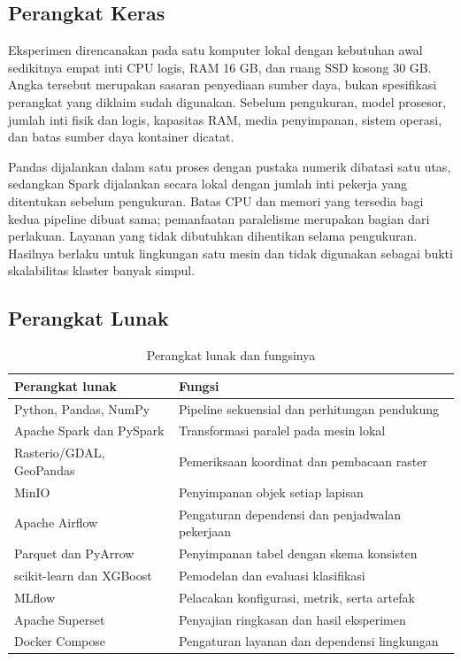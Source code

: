 \subsection{Perangkat Keras}

Eksperimen direncanakan pada satu komputer lokal dengan kebutuhan awal sedikitnya empat inti CPU logis, RAM 16 GB, dan ruang SSD kosong 30 GB. Angka tersebut merupakan sasaran penyediaan sumber daya, bukan spesifikasi perangkat yang diklaim sudah digunakan. Sebelum pengukuran, model prosesor, jumlah inti fisik dan logis, kapasitas RAM, media penyimpanan, sistem operasi, dan batas sumber daya kontainer dicatat.

Pandas dijalankan dalam satu proses dengan pustaka numerik dibatasi satu utas, sedangkan Spark dijalankan secara lokal dengan jumlah inti pekerja yang ditentukan sebelum pengukuran. Batas CPU dan memori yang tersedia bagi kedua pipeline dibuat sama; pemanfaatan paralelisme merupakan bagian dari perlakuan. Layanan yang tidak dibutuhkan dihentikan selama pengukuran. Hasilnya berlaku untuk lingkungan satu mesin dan tidak digunakan sebagai bukti skalabilitas klaster banyak simpul.

\subsection{Perangkat Lunak}

\begin{table}[H]
    \centering
    \caption{Perangkat lunak dan fungsinya}
    \label{tab:bab3-perangkat}
    \small
    \renewcommand{\arraystretch}{1.16}
    \begin{tabularx}{\linewidth}{@{}>{\raggedright\arraybackslash}p{3.8cm}>{\raggedright\arraybackslash}X@{}}
        \toprule
        Perangkat lunak & Fungsi \\
        \midrule
        Python, Pandas, NumPy & Pipeline sekuensial dan perhitungan pendukung \\
        Apache Spark dan PySpark & Transformasi paralel pada mesin lokal \\
        Rasterio/GDAL, GeoPandas & Pemeriksaan koordinat dan pembacaan raster \\
        MinIO & Penyimpanan objek setiap lapisan \\
        Apache Airflow & Pengaturan dependensi dan penjadwalan pekerjaan \\
        Parquet dan PyArrow & Penyimpanan tabel dengan skema konsisten \\
        scikit-learn dan XGBoost & Pemodelan dan evaluasi klasifikasi \\
        MLflow & Pelacakan konfigurasi, metrik, serta artefak \\
        Apache Superset & Penyajian ringkasan dan hasil eksperimen \\
        Docker Compose & Pengaturan layanan dan dependensi lingkungan \\
        \bottomrule
    \end{tabularx}
\end{table}

